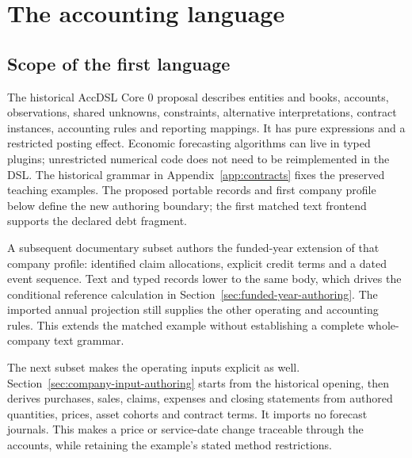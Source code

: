 \chapter{The accounting language}
\label{ch:language}

\section{Scope of the first language}

The historical AccDSL Core 0 proposal describes entities and books, accounts, observations, shared
unknowns, constraints, alternative interpretations, contract instances,
accounting rules and reporting mappings. It has pure expressions and a
restricted posting effect. Economic forecasting algorithms can live in typed
plugins; unrestricted numerical code does not need to be reimplemented in
the DSL. The historical grammar in Appendix~\ref{app:contracts} fixes the preserved
teaching examples. The proposed portable records and first company profile
below define the new authoring boundary; the first matched text frontend
supports the declared debt fragment.

A subsequent documentary subset authors the funded-year extension of that
company profile: identified claim allocations, explicit credit terms and a
dated event sequence. Text and typed records lower to the same body, which
drives the conditional reference calculation in
Section~\ref{sec:funded-year-authoring}. The imported annual projection still
supplies the other operating and accounting rules. This extends the matched
example without establishing a complete whole-company text grammar.

The next subset makes the operating inputs explicit as well.
Section~\ref{sec:company-input-authoring} starts from the historical opening,
then derives purchases, sales, claims, expenses and closing statements from
authored quantities, prices, asset cohorts and contract terms. It imports no
forecast journals. This makes a price or service-date change traceable through
the accounts, while retaining the example's stated method restrictions.

